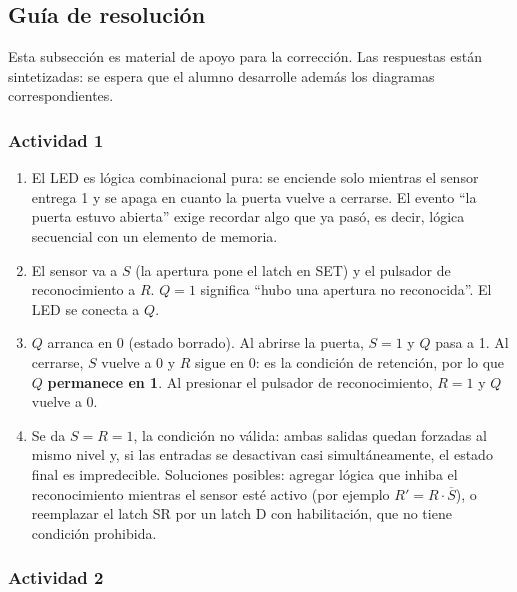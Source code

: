 \subsection{Guía de resolución}

\begin{notabox}
Esta subsección es material de apoyo para la corrección. Las respuestas están sintetizadas: se espera que el alumno desarrolle además los diagramas correspondientes.
\end{notabox}

\subsubsection*{Actividad 1}

\begin{enumerate}[label=\textbf{\alph*)}]
    \item El LED es lógica combinacional pura: se enciende solo mientras el sensor entrega 1 y se apaga en cuanto la puerta vuelve a cerrarse. El evento ``la puerta estuvo abierta'' exige recordar algo que ya pasó, es decir, lógica secuencial con un elemento de memoria.
    \item El sensor va a $S$ (la apertura pone el latch en SET) y el pulsador de reconocimiento a $R$. $Q = 1$ significa ``hubo una apertura no reconocida''. El LED se conecta a $Q$.
    \item $Q$ arranca en 0 (estado borrado). Al abrirse la puerta, $S = 1$ y $Q$ pasa a 1. Al cerrarse, $S$ vuelve a 0 y $R$ sigue en 0: es la condición de retención, por lo que $Q$ \textbf{permanece en 1}. Al presionar el pulsador de reconocimiento, $R = 1$ y $Q$ vuelve a 0.
    \item Se da $S = R = 1$, la condición no válida: ambas salidas quedan forzadas al mismo nivel y, si las entradas se desactivan casi simultáneamente, el estado final es impredecible. Soluciones posibles: agregar lógica que inhiba el reconocimiento mientras el sensor esté activo (por ejemplo $R' = R \cdot \overline{S}$), o reemplazar el latch SR por un latch D con habilitación, que no tiene condición prohibida.
\end{enumerate}

\subsubsection*{Actividad 2}

